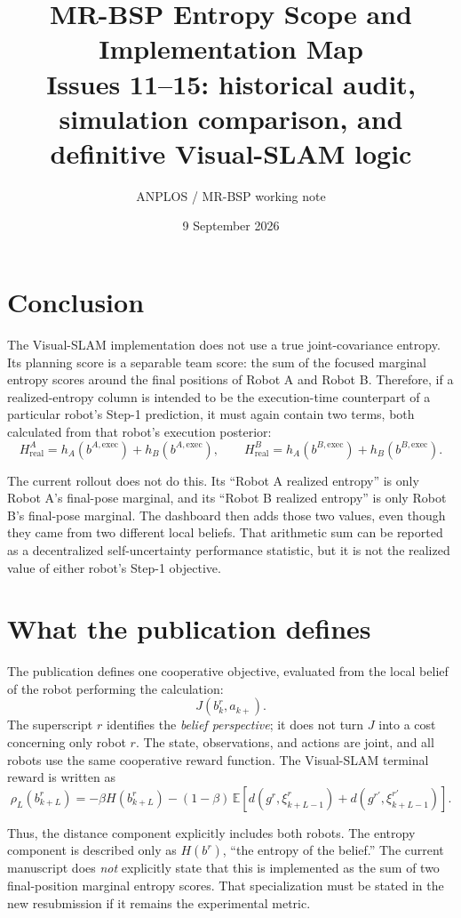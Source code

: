 \documentclass[11pt,a4paper]{article}
\title{MR-BSP Entropy Scope and Implementation Map\\
\large Issues 11--15: historical audit, simulation comparison, and definitive Visual-SLAM logic}
\author{ANPLOS / MR-BSP working note}
\date{9 September 2026}
\newcommand{\hpose}[2]{h_{#1}\!\left(b^{#2}\right)}
\begin{document}
\maketitle

\section{Conclusion}

The Visual-SLAM implementation does not use a true joint-covariance entropy.
Its planning score is a separable team score: the sum of the focused marginal
entropy scores around the final positions of Robot A and Robot B.  Therefore,
if a realized-entropy column is intended to be the execution-time counterpart
of a particular robot's Step-1 prediction, it must again contain two terms,
both calculated from that robot's execution posterior:
\[
  H_{\mathrm{real}}^A
  = \hpose{A}{A,\mathrm{exec}}+\hpose{B}{A,\mathrm{exec}},
  \qquad
  H_{\mathrm{real}}^B
  = \hpose{A}{B,\mathrm{exec}}+\hpose{B}{B,\mathrm{exec}}.
\]

The current rollout does not do this.  Its ``Robot A realized entropy'' is only
Robot A's final-pose marginal, and its ``Robot B realized entropy'' is only
Robot B's final-pose marginal.  The dashboard then adds those two values, even
though they came from two different local beliefs.  That arithmetic sum can be
reported as a decentralized self-uncertainty performance statistic, but it is
not the realized value of either robot's Step-1 objective.

\section{What the publication defines}

The publication defines one cooperative objective, evaluated from the local
belief of the robot performing the calculation:
\[
  J(b_k^r,a_{k+}).
\]
The superscript $r$ identifies the \emph{belief perspective}; it does not turn
$J$ into a cost concerning only robot $r$.  The state, observations, and
actions are joint, and all robots use the same cooperative reward function.
The Visual-SLAM terminal reward is written as
\[
  \rho_L(b_{k+L}^r)
  =-\beta H(b_{k+L}^r)
   -(1-\beta)\,
    \mathbb E\!\left[
      d(g^r,\xi^r_{k+L-1})+d(g^{r'},\xi^{r'}_{k+L-1})
    \right].
\]

Thus, the distance component explicitly includes both robots.  The entropy
component is described only as $H(b^r)$, ``the entropy of the belief.''  The
current manuscript does \emph{not} explicitly state that this is implemented
as the sum of two final-position marginal entropy scores.  That specialization
must be stated in the new resubmission if it remains the experimental metric.
\end{document}
